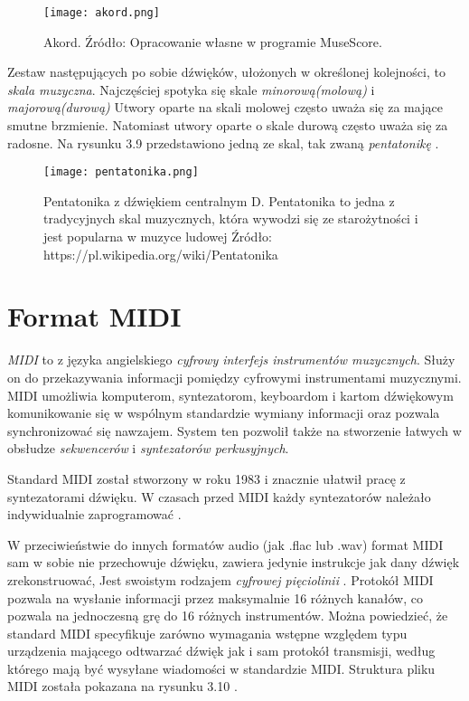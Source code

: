  \begin{figure}[H]
\texttt{[image: akord.png]}
\centering
\caption{Akord. Źródło: Opracowanie własne w programie MuseScore.}
\centering
\end{figure}

Zestaw następujących po sobie dźwięków, ułożonych w określonej kolejności, to \textit{skala muzyczna}. Najczęściej spotyka się skale \textit{minorową(molową)} i \textit{majorową(durową)} Utwory oparte na skali molowej często uważa się za mające smutne brzmienie. Natomiast utwory oparte o skale durową często uważa się za radosne. Na rysunku 3.9 przedstawiono jedną ze skal, tak zwaną \textit{pentatonikę} \citep[s. 81 - 82]{Pilhofer2018}. 

 \begin{figure}[H]
\texttt{[image: pentatonika.png]}
\caption{Pentatonika z dźwiękiem centralnym D. Pentatonika to jedna z tradycyjnych skal muzycznych, która wywodzi się ze starożytności i jest popularna w muzyce ludowej  Źródło: https://pl.wikipedia.org/wiki/Pentatonika}
\centering
\end{figure}

\section{Format MIDI}
\textit{MIDI} to z języka angielskiego \textit{cyfrowy interfejs instrumentów muzycznych}. Służy on do przekazywania informacji pomiędzy cyfrowymi instrumentami muzycznymi. MIDI umożliwia komputerom, syntezatorom, keyboardom i kartom dźwiękowym komunikowanie się w wspólnym standardzie wymiany informacji oraz pozwala synchronizować się nawzajem. System ten pozwolił także na stworzenie łatwych w obsłudze \textit{sekwencerów} i \textit{syntezatorów perkusyjnych}.

Standard MIDI został stworzony w roku 1983 i znacznie ułatwił pracę z syntezatorami dźwięku. W czasach przed MIDI każdy syntezatorów należało indywidualnie zaprogramować \citep{MIDI}.

W przeciwieństwie do innych formatów audio (jak .flac lub .wav) format MIDI sam w sobie nie przechowuje dźwięku, zawiera jedynie instrukcje jak dany dźwięk zrekonstruować, Jest swoistym rodzajem \textit{cyfrowej pięciolinii} \citep[s. 1 - 2]{MIDI_Format}.
Protokół MIDI pozwala na wysłanie informacji przez maksymalnie 16 różnych kanałów, co pozwala na jednoczesną grę do 16 różnych instrumentów. Można powiedzieć, że standard MIDI specyfikuje zarówno wymagania wstępne względem typu urządzenia mającego odtwarzać dźwięk jak i sam protokół transmisji, według którego mają być wysyłane wiadomości w standardzie MIDI. Struktura pliku MIDI została pokazana na rysunku 3.10 \citep[s. 1 - 2]{MIDI_Format}.

